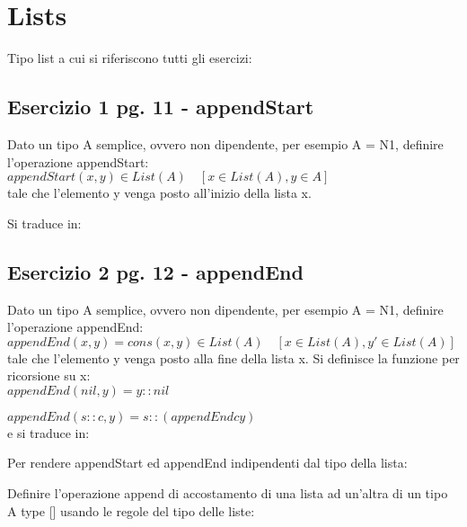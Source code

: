 \newpage
\section{Lists}

Tipo list a cui si riferiscono tutti gli esercizi:



\subsection{Esercizio 1 pg. 11 - appendStart}

Dato un tipo A semplice, ovvero non dipendente, per esempio A = N1, definire
l'operazione appendStart: \\

$appendStart(x, y) \in List(A)\quad[x \in List(A), y \in A]$ \\

tale che l’elemento y venga posto all'inizio della lista x.

Si traduce in:



\subsection{Esercizio 2 pg. 12 - appendEnd}

Dato un tipo A semplice, ovvero non dipendente, per esempio A = N1, definire
l'operazione appendEnd: \\

$appendEnd(x, y) = cons(x, y) \in List(A)\quad[x \in List(A), y' \in List(A)]$ \\

tale che l’elemento y venga posto alla fine della lista x.
Si definisce la funzione per ricorsione su x: \\

$appendEnd(nil, y) = y :: nil$

$appendEnd( s :: c, y) = s :: (appendEnd c y)$ \\

e si traduce in:



Per rendere appendStart ed appendEnd indipendenti dal tipo della lista:



Definire l'operazione append di accostamento di una lista ad un'altra di un tipo
A type [] usando le regole del tipo delle liste: \\

